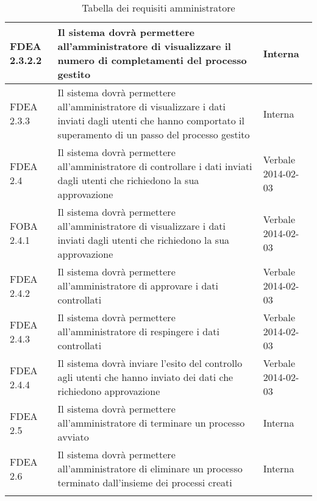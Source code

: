 \begin{longtable}{lXp{}}
\midrule
FDEA 2.3.2.2&Il sistema dovrà permettere all'amministratore di visualizzare il numero di completamenti del processo gestito&Interna\\
\midrule
FDEA 2.3.3&Il sistema dovrà permettere all'amministratore di visualizzare i dati inviati dagli utenti che hanno comportato il superamento di un passo del processo gestito&Interna\\
\midrule
FDEA 2.4&Il sistema dovrà permettere all'amministratore di controllare i dati inviati dagli utenti che richiedono la sua approvazione& Verbale 2014-02-03\\
\midrule
FOBA 2.4.1&Il sistema dovrà permettere all'amministratore di visualizzare i dati inviati dagli utenti che richiedono la sua approvazione&Verbale 2014-02-03\\
\midrule
FDEA 2.4.2&Il sistema dovrà permettere all'amministratore di approvare i dati controllati&Verbale 2014-02-03\\
\midrule
FDEA 2.4.3&Il sistema dovrà permettere all'amministratore di respingere i dati controllati&Verbale 2014-02-03\\
\midrule
FDEA 2.4.4&Il sistema dovrà inviare l'esito del controllo agli utenti che hanno inviato dei dati che richiedono approvazione&Verbale 2014-02-03\\
\midrule
FDEA 2.5&Il sistema dovrà permettere all'amministratore di terminare un processo avviato&Interna\\
\midrule
FDEA 2.6&Il sistema dovrà permettere all'amministratore di eliminare un processo terminato dall'insieme dei processi creati&Interna\\ 
\bottomrule
\caption{Tabella dei requisiti amministratore}
\end{longtable}